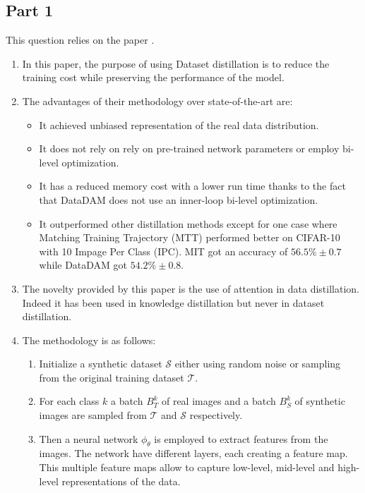 \documentclass[conference]{IEEEtran}
\begin{document}
\subsection{Part 1}
This question relies on the paper \cite{sajedi2023datadam}.
\begin{enumerate}[label=(\alph*)]
    \item In this paper, the purpose of using Dataset distillation is to reduce the training cost while preserving the performance of the model.
    \vspace{3mm}
    \item The advantages of their methodology over state-of-the-art are:
    \begin{itemize}
        \item It achieved unbiased representation of the real data distribution.
        \item It does not rely on rely on pre-trained network parameters or employ bi-level optimization.
        \item It has a reduced memory cost with a lower run time thanks to the fact that DataDAM does not use an inner-loop bi-level optimization.
        \item It outperformed other distillation methods except for one case where Matching Training Trajectory (MTT) performed better on CIFAR-10 with 10 Impage Per Class (IPC). MIT got an accuracy of $56.5\% \pm 0.7$ while DataDAM got $54.2\% \pm 0.8$.
    \end{itemize}
    \vspace{3mm}
    \item The novelty provided by this paper is the use of attention in data distillation. Indeed it has been used in knowledge distillation but never in dataset distillation.
    \vspace{3mm}
    \item The methodology is as follows:
    \begin{enumerate}[label=(\arabic*)]
        \item Initialize a synthetic dataset $\mathcal{S}$ either using random noise or sampling from the original training dataset $\mathcal{T}$.
        \item For each class $k$ a batch $B_T^k$ of real images and a batch $B_S^k$ of synthetic images are sampled from $\mathcal{T}$ and $\mathcal{S}$ respectively.
        \item Then a neural network $\phi_\theta$ is employed to extract features from the images. The network have different layers, each creating a feature map. This multiple feature maps allow to capture low-level, mid-level and high-level representations of the data.

\end{enumerate}
\end{enumerate}
\end{document}
